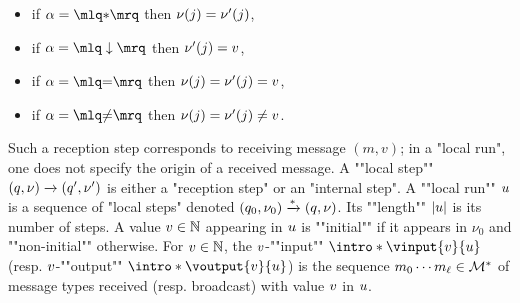	\begin{minipage}[t]{6cm}
		\begin{itemize}
			\item if $\anact = \quotemarks{\dummyact}$ 
			then $\nu(j) = \nu'(j)$,
			\item if $\anact = \quotemarks{\enregact}$ then $\nu'(j) = v$,
		\end{itemize}
	\end{minipage}
	\begin{minipage}[t]{6cm}
		\begin{itemize}
			\item if $\anact = \quotemarks{\eqtestact}$ then $\nu(j) = \nu'(j)= v$,
			\item if $\anact = \quotemarks{\diseqtestact}$ then $\nu(j) = \nu'(j) \ne v$.
		\end{itemize}
	\end{minipage}
	\AP Such a reception step corresponds to receiving message $(m,v)$; in a "local run", one does not specify the origin of a received message. 
	A ""local step"" $(q,\nu) \xrightarrow{} (q',\nu')$ is either a "reception step" or an "internal step". A ""local run"" $u$ is a sequence of "local steps" denoted $(q_0, \nu_0) \xrightarrow{*} (q, \nu)$. Its ""length"" $|u|$ is its number of steps. %
	A value $v \in \mathbb{N}$ appearing in $u$ is ""initial"" if it appears in $\nu_0$ and ""non-initial"" otherwise. 
	For $v \in \mathbb{N}$, the $v$-""input"" $\intro*\vinput{\aval}{\localrun}$ (resp. $v$-""output"" $\intro*\voutput{\aval}{\localrun}$) is the sequence $m_0 \cdots m_{\ell} \in \mathcal{M}^*$ of message types received (resp. broadcast) with value $v$ in $u$.

